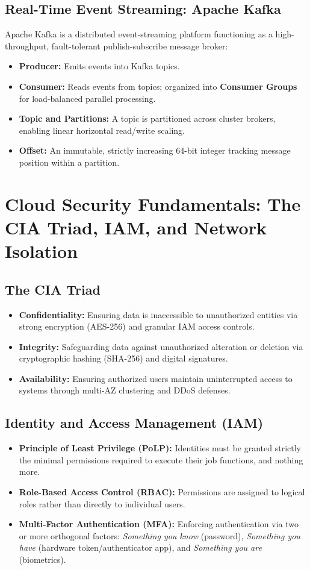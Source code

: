 \subsection{Real-Time Event Streaming: Apache Kafka}
Apache Kafka is a distributed event-streaming platform functioning as a high-throughput, fault-tolerant publish-subscribe message broker:
\begin{itemize}
    \item \textbf{Producer:} Emits events into Kafka topics.
    \item \textbf{Consumer:} Reads events from topics; organized into \textbf{Consumer Groups} for load-balanced parallel processing.
    \item \textbf{Topic and Partitions:} A topic is partitioned across cluster brokers, enabling linear horizontal read/write scaling.
    \item \textbf{Offset:} An immutable, strictly increasing 64-bit integer tracking message position within a partition.
\end{itemize}


\section{Cloud Security Fundamentals: The CIA Triad, IAM, and Network Isolation}
\label{sec:cloud_security}

\subsection{The CIA Triad}
\begin{itemize}
    \item \textbf{Confidentiality:} Ensuring data is inaccessible to unauthorized entities via strong encryption (AES-256) and granular IAM access controls.
    \item \textbf{Integrity:} Safeguarding data against unauthorized alteration or deletion via cryptographic hashing (SHA-256) and digital signatures.
    \item \textbf{Availability:} Ensuring authorized users maintain uninterrupted access to systems through multi-AZ clustering and DDoS defenses.
\end{itemize}

\subsection{Identity and Access Management (IAM)}
\begin{itemize}
    \item \textbf{Principle of Least Privilege (PoLP):} Identities must be granted strictly the minimal permissions required to execute their job functions, and nothing more.
    \item \textbf{Role-Based Access Control (RBAC):} Permissions are assigned to logical roles rather than directly to individual users.
    \item \textbf{Multi-Factor Authentication (MFA):} Enforcing authentication via two or more orthogonal factors: \textit{Something you know} (password), \textit{Something you have} (hardware token/authenticator app), and \textit{Something you are} (biometrics).
\end{itemize}


